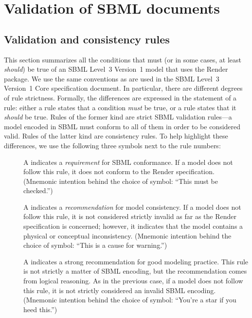 
\section{Validation of SBML documents}
\label{apdx-validation}

\subsection{Validation and consistency rules}
\label{validation-rules}

This section summarizes all the conditions that must (or in some cases,
at least \emph{should}) be true of an SBML Level~3 Version~1 model that
uses the Render package. We use the same conventions as are used in the
SBML Level~3 Version~1 Core specification document. In particular, there
are different degrees of rule strictness. Formally, the differences are
expressed in the statement of a rule: either a rule states that a
condition \emph{must} be true, or a rule states that it \emph{should} be
true. Rules of the former kind are strict SBML validation rules---a
model encoded in SBML must conform to all of them in order to be
considered valid. Rules of the latter kind are consistency rules. To
help highlight these differences, we use the following three symbols
next to the rule numbers:

\begin{description}

\item[\hspace*{6.5pt}\vSymbol\vsp] A \vSymbolName indicates a
\emph{requirement} for SBML conformance. If a model does not follow this
rule, it does not conform to the Render specification. (Mnemonic
intention behind the choice of symbol: ``This must be checked.'')

\item[\hspace*{6.5pt}\cSymbol\csp] A \cSymbolName indicates a
\emph{recommendation} for model consistency. If a model does not follow
this rule, it is not considered strictly invalid as far as the Render
specification is concerned; however, it indicates that the model
contains a physical or conceptual inconsistency. (Mnemonic intention
behind the choice of symbol: ``This is a cause for warning.'')

\item[\hspace*{6.5pt}\mSymbol\msp] A \mSymbolName indicates a strong
recommendation for good modeling practice. This rule is not strictly a
matter of SBML encoding, but the recommendation comes from logical
reasoning. As in the previous case, if a model does not follow this
rule, it is not strictly considered an invalid SBML encoding. (Mnemonic
intention behind the choice of symbol: ``You're a star if you heed
this.'')

\end{description}

